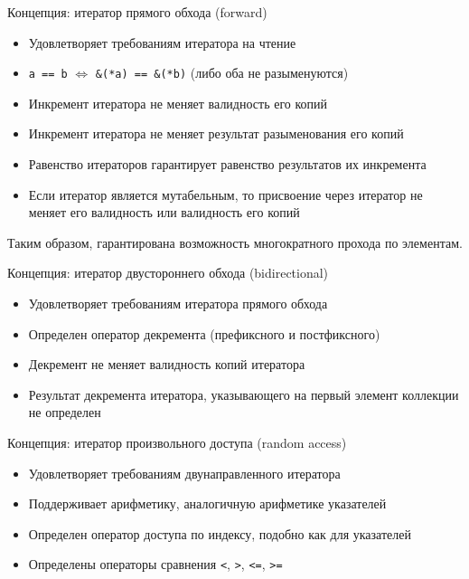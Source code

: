 \documentclass[unknownkeysallowed,xcolor=table]{beamer}
\begin{document}
\begin{frame}[fragile]{Концепция: итератор прямого обхода (forward)}

\begin{itemize}
  \item Удовлетворяет требованиям итератора на чтение
  \item \lstinline{a == b} $\Leftrightarrow$ \lstinline{&(*a) == &(*b)} (либо оба не разыменуются)
  \item Инкремент итератора не меняет валидность его копий
  \item Инкремент итератора не меняет результат разыменования его копий
  \item Равенство итераторов гарантирует равенство результатов их инкремента
  \item Если итератор является мутабельным, то присвоение через итератор не меняет его валидность или валидность его копий
\end{itemize}

\vspace{1em}

Таким образом, гарантирована возможность многократного прохода по элементам.

\end{frame}

\begin{frame}[fragile]{Концепция: итератор двустороннего обхода (bidirectional)}

\begin{itemize}
  \item Удовлетворяет требованиям итератора прямого обхода \vspace{1em}
  \item Определен оператор декремента (префиксного и постфиксного) \vspace{1em}
  \item Декремент не меняет валидность копий итератора \vspace{1em}
  \item Результат декремента итератора, указывающего на первый элемент коллекции не определен
\end{itemize}

\end{frame}

\begin{frame}[fragile]{Концепция: итератор произвольного доступа (random access)}

\begin{itemize}
  \item Удовлетворяет требованиям двунаправленного итератора \vspace{1em}
  \item Поддерживает арифметику, аналогичную арифметике указателей \vspace{1em}
  \item Определен оператор доступа по индексу, подобно как для указателей \vspace{1em}
  \item Определены операторы сравнения \lstinline{<}, \lstinline{>}, \lstinline{<=}, \lstinline{>=}
\end{itemize}

\end{frame}
\end{document}
